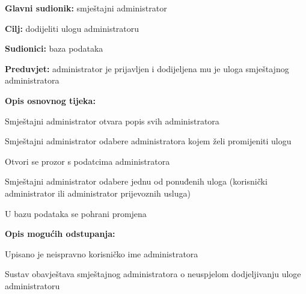                        \noindent {}
					\begin{packed_item}
	
						\item \textbf{Glavni sudionik: } smještajni administrator
						\item  \textbf{Cilj:} dodijeliti ulogu administratoru
						\item  \textbf{Sudionici:} baza podataka
						\item  \textbf{Preduvjet:} administrator je prijavljen i dodijeljena mu je uloga smještajnog administratora
						\item  \textbf{Opis osnovnog tijeka:}
						
						\item[] \begin{packed_enum}
	
							\item Smještajni administrator otvara popis svih administratora
							\item Smještajni administrator odabere administratora kojem želi promijeniti ulogu
							\item Otvori se prozor s podatcima administratora
							\item Smještajni administrator odabere jednu od ponuđenih uloga (korisnički administrator ili administrator prijevoznih usluga)
							\item U bazu podataka se pohrani promjena
						\end{packed_enum}
						
						\item  \textbf{Opis mogućih odstupanja:}
						
						\item[] \begin{packed_item}
	
							\item[3.a] Upisano je neispravno korisničko ime administratora
							\item[] \begin{packed_enum}
								
								\item Sustav obavještava smještajnog administratora o neuspjelom dodjeljivanju uloge administratoru
								
							\end{packed_enum}
			
						\end{packed_item}
					\end{packed_item}

